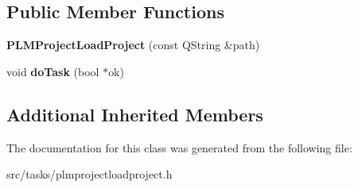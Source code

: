 \subsection*{Public Member Functions}
\begin{DoxyCompactItemize}
\item 
{\bfseries P\+L\+M\+Project\+Load\+Project} (const Q\+String \&path)\hypertarget{class_p_l_m_project_load_project_ad84ee1f8418344d840b9cf1cce88eb0e}{}\label{class_p_l_m_project_load_project_ad84ee1f8418344d840b9cf1cce88eb0e}

\item 
void {\bfseries do\+Task} (bool $\ast$ok)\hypertarget{class_p_l_m_project_load_project_a73468241fa65d5b37ed770aeacf41ada}{}\label{class_p_l_m_project_load_project_a73468241fa65d5b37ed770aeacf41ada}

\end{DoxyCompactItemize}
\subsection*{Additional Inherited Members}


The documentation for this class was generated from the following file\+:\begin{DoxyCompactItemize}
\item 
src/tasks/plmprojectloadproject.\+h\end{DoxyCompactItemize}
